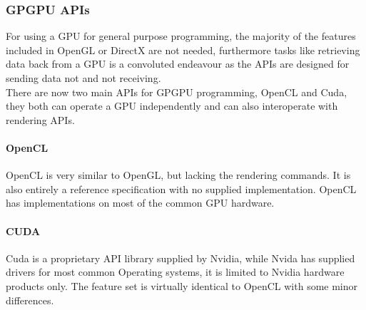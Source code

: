 \documentclass[12pt,a4paper]{article}
\begin{document}
\subsubsection{GPGPU APIs}
For using  a GPU for general purpose programming, the majority of the features included in OpenGL or DirectX are not needed, furthermore tasks like retrieving data back from a GPU is a convoluted endeavour as the APIs are designed for sending data not and not receiving.
\\
There are now two main APIs for GPGPU programming, OpenCL and Cuda, they both can operate a GPU independently and can also interoperate with rendering APIs.

\paragraph{OpenCL}
OpenCL is very similar to OpenGL, but lacking the rendering commands. It is also entirely a reference specification with no supplied implementation. OpenCL has implementations on most of the common GPU hardware.

\paragraph{CUDA}
Cuda is a proprietary API library supplied by Nvidia, while Nvida has supplied drivers for most common Operating systems,  it is limited to Nvidia hardware products only. The feature set is virtually identical to OpenCL with some minor differences.
\end{document}
